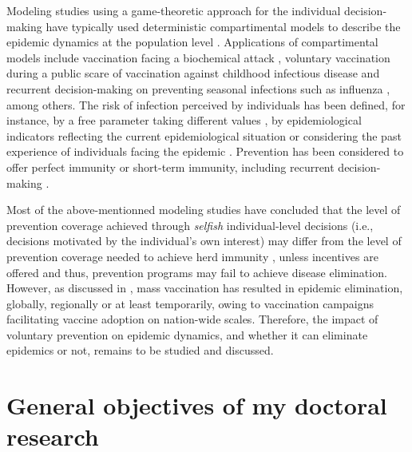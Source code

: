 Modeling studies using a game-theoretic approach for the individual decision-making have typically used deterministic compartimental models to describe the epidemic dynamics at the population level \cite[]{Bauch2003,Bauch2004,Breban2007,DOnofrio2007,Vardavas2007,Galvani2007,Breban2011,Liu2012}. Applications of compartimental models include vaccination facing a biochemical attack \cite[]{Bauch2003}, voluntary vaccination during a public scare of vaccination against childhood infectious disease \cite[]{Bauch2004} and recurrent decision-making on preventing seasonal infections such as influenza \cite[]{Breban2007,Galvani2007}, among others. The risk of infection perceived by individuals has been defined, for instance, by a free parameter taking different values \cite[]{Bauch2004}, by epidemiological indicators reflecting the current epidemiological situation \cite[]{Bauch2003,DOnofrio2007,Breban2011,Liu2012} or considering the past experience of individuals facing the epidemic \cite[]{Breban2007,Vardavas2007,DOnofrio2007}. Prevention has been considered to offer perfect immunity \cite[]{Bauch2003,Bauch2004,DOnofrio2007} or short-term immunity, including recurrent decision-making \cite[]{Breban2007}. 

Most of the above-mentionned modeling studies have concluded that the level of prevention coverage achieved through \emph{selfish} individual-level decisions  (i.e., decisions motivated by the individual's own interest) may differ from the level of prevention coverage needed to achieve herd immunity \cite[]{Bauch2003,Bauch2004,Breban2007,Galvani2007,Breban2011}, unless incentives are offered \cite[]{Vardavas2007,Liu2012} and thus, prevention programs may fail to achieve disease elimination. %
However, as discussed in , mass vaccination has resulted in epidemic elimination, globally, regionally or at least temporarily, owing to vaccination campaigns facilitating vaccine adoption on nation-wide scales. Therefore, the impact of voluntary prevention on epidemic dynamics, and whether it can eliminate epidemics or not, remains to be studied and discussed.

\section{General objectives of my doctoral research}
\label{Intro:Objectives} 

